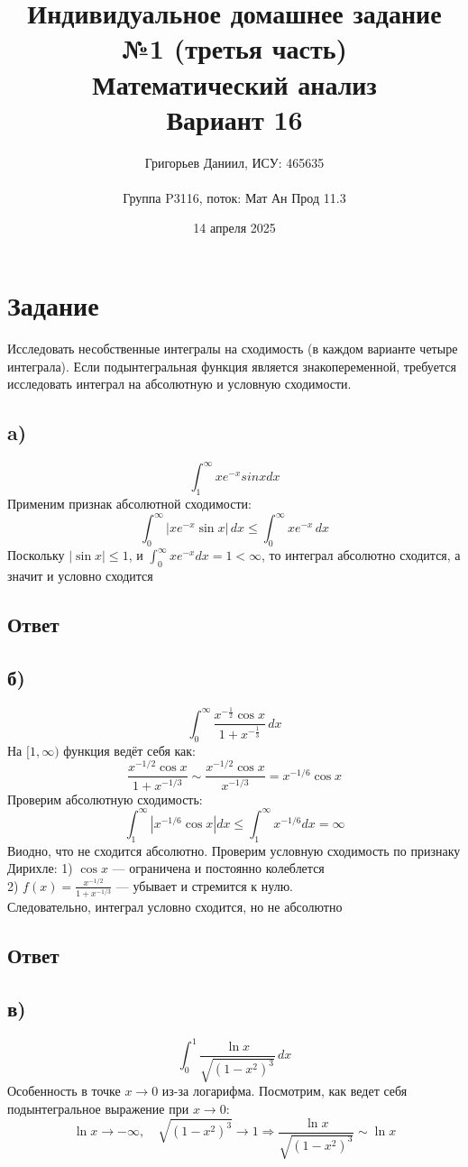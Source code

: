 \documentclass{article}
\title{Индивидуальное домашнее задание №1 (третья часть)\\Математический анализ\\Вариант 16}
\author{Григорьев Даниил, ИСУ: 465635\\\\ Группа P3116, поток: Мат Ан Прод 11.3}
\date{14 апреля 2025}
\begin{document}
\maketitle

\section*{Задание}
Исследовать несобственные интегралы на сходимость (в каждом варианте
четыре интеграла). Если подынтегральная функция является
знакопеременной, требуется исследовать интеграл на абсолютную и
условную сходимости.
\subsection*{a)}\[
\int_1^\infty xe^{-x}sinxdx
\]
Применим признак абсолютной сходимости:
\[
\int_0^{\infty} |xe^{-x} \sin x| \, dx \leq \int_0^{\infty} xe^{-x} \, dx
\]
Поскольку $|\sin x| \leq 1$, и $\int_0^{\infty} xe^{-x} dx = 1 < \infty$, то интеграл абсолютно сходится, а значит и условно сходится
\subsection*{Ответ}
\subsection*{б)}
\[\int_0^{\infty} \frac{x^{-\frac{1}{2}} \cos x}{1 + x^{-\frac{1}{3}}} \, dx
\]
На $[1, \infty)$ функция ведёт себя как:
\[
\frac{x^{-1/2} \cos x}{1 + x^{-1/3}} \sim \frac{x^{-1/2} \cos x}{x^{-1/3}} = x^{-1/6} \cos x
\]
Проверим абсолютную сходимость:
\[
\int_1^{\infty} \left| x^{-1/6} \cos x \right| dx \leq \int_1^{\infty} x^{-1/6} dx = \infty
\]
Виодно, что не сходится абсолютно. Проверим условную сходимость по признаку Дирихле: 1) $\cos x$ — ограничена и постоянно колеблется\\
2) $f(x) = \frac{x^{-1/2}}{1 + x^{-1/3}}$ — убывает и стремится к нулю.\\

Следовательно, интеграл условно сходится, но не абсолютно
\subsection*{Ответ}
\subsection*{в)}
\[
\int_0^1 \frac{\ln x}{\sqrt{(1 - x^2)^3}} \, dx
\]
Особенность в точке $x \to 0$ из-за логарифма. Посмотрим, как ведет себя подынтегральное выражение при $x \to 0$:
\[
\ln x \to -\infty, \quad \sqrt{(1 - x^2)^3} \to 1 \Rightarrow \frac{\ln x}{\sqrt{(1 - x^2)^3}} \sim \ln x
\]
\end{document}
